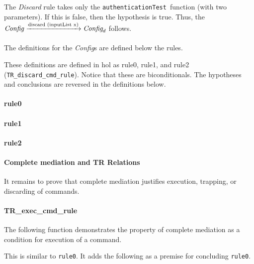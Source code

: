 \documentclass[../../main/main.tex]{subfiles}
\begin{document}
The \textit{Discard} rule takes only the \texttt{authenticationTest }function (with two parameters).  If this is false, then the hypothesis is true.  Thus, the  $\text{\textit{Config}}  \xrightarrow[\text{}]{\text{discard (inputList x)}} \textit{Config}_d$ follows.

The definitions for the \textit{Config}s are defined below the rules. 

These definitions are defined in \gls{hol} as rule0, rule1, and rule2 (\texttt{TR_discard_cmd_rule}).  Notice that these are biconditionals.  The hypotheses and conclusions are reversed in the definitions below.  

\paragraph*{rule0}
\HOLssmTheoremsTRruleZero



\paragraph*{rule1}
\HOLssmTheoremsTRruleOne

\paragraph*{rule2}


\HOLssmTheoremsTRXXdiscardXXcmdXXrule


\paragraph*{Complete mediation and TR Relations}

It remains to prove that complete mediation justifies execution, trapping, or discarding of commands. 

\paragraph*{TR_exec_cmd_rule}

The following function demonstrates the property of complete mediation as a condition for execution of a command.


\HOLssmTheoremsTRXXexecXXcmdXXrule

This is similar to \texttt{rule0}.  It adds the following as a premise for concluding \texttt{rule0}.
\end{document}
